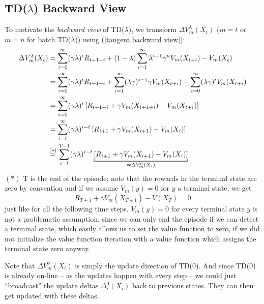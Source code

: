 \subsection{TD(\(\lambda\)) Backward View}
To motivate the \emph{backward view} of TD(\(\lambda\)), we transform \(\Delta V_m^\lambda (X_t)\) (\(m=t\) or \(m=n\) for batch TD(\(\lambda\))) using (\ref{tangent backward view}):
\begin{align}
	\Delta V_m^\lambda (X_t)&= \sum_{i=0}^\infty (\gamma\lambda)^i R_{t+1+i}
	+ (1-\lambda)\sum_{i=1}^\infty \lambda^{i-1}\gamma^n V_m(X_{t+i}) - V_m(X_t)
	\nonumber\\
	&=\sum_{i=0}^\infty (\gamma\lambda)^i R_{t+1+i} 
	+ \sum_{i=1}^\infty (\lambda\gamma)^{i-1} \gamma V_m(X_{t+i}) 
	- \sum_{i=0}^\infty (\lambda\gamma)^i V_m(X_{t+i})
	\nonumber\\
	&=\sum_{i=0}^\infty(\gamma\lambda)^i \left[
		R_{t+1+i} + \gamma V_m(X_{t+1+i}) - V_m(X_{t+i})
	\right]
	\nonumber\\
	&=\sum_{i=t}^\infty(\gamma\lambda)^{i-t} \left[
		R_{i+1} + \gamma V_m(X_{i+1}) - V_m(X_{i})
	\right]
	\nonumber\\
	&\lxeq{(*)}\sum_{i=t}^{T-1}(\gamma\lambda)^{i-t} \underbracket[0.7pt]{\left[
		R_{i+1} + \gamma V_m(X_{i+1}) - V_m(X_{i})
	\right]}_{
		=\Delta V^0_m(X_i)
	}\label{terminal assumptions}
\end{align}
\((*)\) T is the end of the episode; note that the rewards in the terminal state are zero by convention and if we assume \(V_m(y)=0\) for \(y\) a terminal state, we get
\[
	R_{T+1}+\gamma V_m(X_{T+1}) -V(X_T)=0
\]
just like for all the following time steps. \(V_m(y)=0\) for every terminal state \(y\) is not a problematic assumption, since we can only end the episode if we can detect a terminal state, which easily allows us to set the value function to zero, if we did not initialize the value function iteration with a value function which assigns the terminal state zero anyway. 

Note that \(\Delta V^0_m(X_i)\) is simply the update direction of TD(0). And since TD(0) is already on-line -- as the updates happen with every step -- we could just ``broadcast'' the update deltas \(\Delta_i^0(X_i)\) back to previous states. They can then get updated with these deltas.

